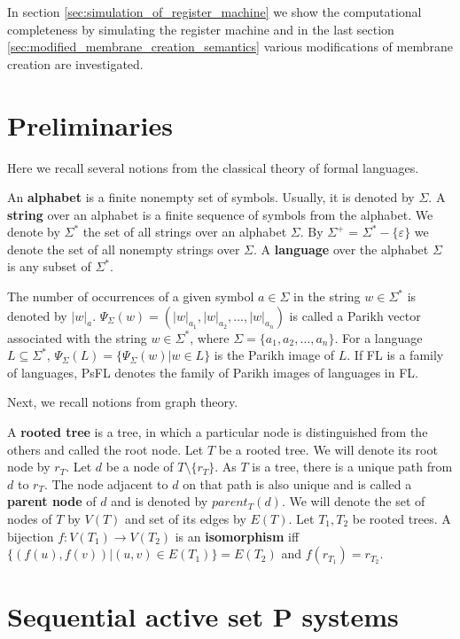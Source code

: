 \documentclass[llncs,submission,copyright,creativecommons]{../lib/lncs/llncs}
\def\eps{\varepsilon}
\begin{document}
In section \ref{sec:simulation_of_register_machine} we show the computational completeness by simulating the register machine and in the last section \ref{sec:modified_membrane_creation_semantics} various modifications of membrane creation are investigated.

\section{Preliminaries}
\label{sec:preliminaries}

Here we recall several notions from the classical theory of formal languages.

An {\bf alphabet} is a finite nonempty set of symbols. Usually, it is denoted by $\Sigma$. A {\bf string} over an alphabet is a finite sequence of symbols from the alphabet. We denote by $\Sigma^*$ the set of all strings over an alphabet $\Sigma$. By $\Sigma^+$ = $\Sigma^* - \{\eps\}$ we denote the set of all nonempty strings over $\Sigma$. A {\bf language} over the alphabet $\Sigma$ is any subset of $\Sigma^*$.

The number of occurrences of a given symbol $a\in \Sigma$ in the string $w\in \Sigma^*$ is denoted by $|w|_a$. $\Psi_\Sigma(w)=(|w|_{a_1},|w|_{a_2},\dots,|w|_{a_n})$ is called a Parikh vector associated with the string $w\in \Sigma^*$, where $\Sigma=\{a_1,a_2,\dots, a_n\}$. For a language $L\subseteq \Sigma^*$, $\Psi_\Sigma(L)=\{\Psi_\Sigma(w)|w\in L\}$ is the Parikh image of $L$. If FL is a family of languages, PsFL denotes the family of Parikh images of languages in FL.

Next, we recall notions from graph theory.

A {\bf rooted tree} is a tree, in which a particular node is distinguished from the others and called the root node.
Let $T$ be a rooted tree. We will denote its root node by $r_T$.
Let $d$ be a node of $T\setminus\{r_T\}$.
As $T$ is a tree, there is a unique path from $d$ to $r_T$. 
The node adjacent to $d$ on that path is also unique and is called a {\bf parent node} of $d$ and is denoted by $parent_T(d)$.
We will denote the set of nodes of $T$ by $V(T)$ and set of its edges by $E(T)$.
Let $T_1, T_2$ be rooted trees. A bijection $f: V(T_1)\rightarrow V(T_2)$ is an {\bf isomorphism} iff $\{(f(u),f(v))|(u,v)\in E(T_1)\} = E(T_2)$ and $f(r_{T_1}) = r_{T_2}$. 

  
\section{Sequential active set P systems}
\label{sec:p systems}
\end{document}
